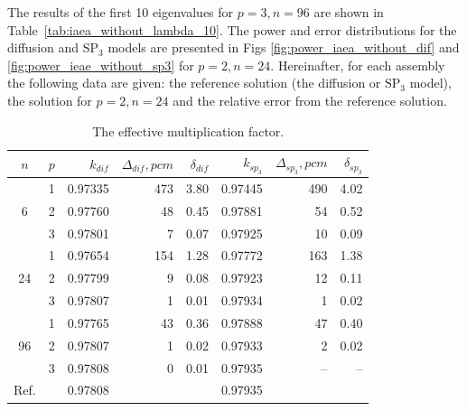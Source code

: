 \documentclass[authoryear]{elsarticle}
\begin{document}
The results of the first 10 eigenvalues for $ p = 3, n = 96 $ are shown in Table~\ref{tab:iaea_without_lambda_10}.
The power and error distributions for the diffusion and $\mathrm{SP_3}$ models are presented in Figs \ref{fig:power_iaea_without_dif} and \ref{fig:power_ieae_without_sp3} for $p = 2, n = 24$.
Hereinafter, for each assembly the following data are given: the reference solution (the diffusion or $\mathrm{SP_3}$ model), the solution for $p = 2, n = 24$ and the relative error from the reference solution.

\begin{table}[h]
\caption{The effective multiplication factor.}
\label{tab:iaea_without_lambda}
\begin{center}
\begin{tabular}{c r r r r r r r}
\hline
$n$ & $p$ & $k_{dif}$ & $\Delta_{dif},pcm$ & $\delta_{dif}$ &$k_{sp_3}$& $\Delta_{sp_3},pcm$ & $\delta_{sp_3}$ \\
\hline
	& 1	& 0.97335& 473& 3.80& 0.97445& 490&  4.02\\
6	& 2	& 0.97760&  48& 0.45& 0.97881&  54&  0.52\\
	& 3	& 0.97801&   7& 0.07& 0.97925&  10&  0.09\\
\hline
	& 1	& 0.97654& 154& 1.28& 0.97772& 163& 1.38\\
24& 2	& 0.97799&   9& 0.08& 0.97923&  12& 0.11\\
	& 3	& 0.97807&   1& 0.01& 0.97934&   1& 0.02\\ 
\hline
	& 1	& 0.97765&  43& 0.36& 0.97888&  47& 0.40\\
96& 2	& 0.97807&   1& 0.02& 0.97933&   2& 0.02\\
	& 3	& 0.97808&   0& 0.01& 0.97935&  --& --\\ 
\hline
Ref.&   & 0.97808&    &     & 0.97935&    &\\ 
\hline
\end{tabular}
\end{center}
\end{table}
\end{document}
